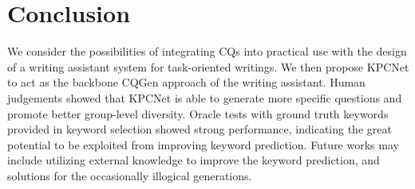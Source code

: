 \section{Conclusion}
We consider the possibilities of integrating CQs into practical use with the design of a writing assistant system for task-oriented writings. We then propose KPCNet to act as the backbone CQGen approach of the writing assistant. Human judgements showed that KPCNet is able to generate more specific questions and promote better group-level diversity. Oracle tests with ground truth keywords provided in keyword selection showed strong performance, indicating the great potential to be exploited from improving keyword prediction. Future works may include utilizing external knowledge to improve the keyword prediction, and solutions for the occasionally illogical generations. 

